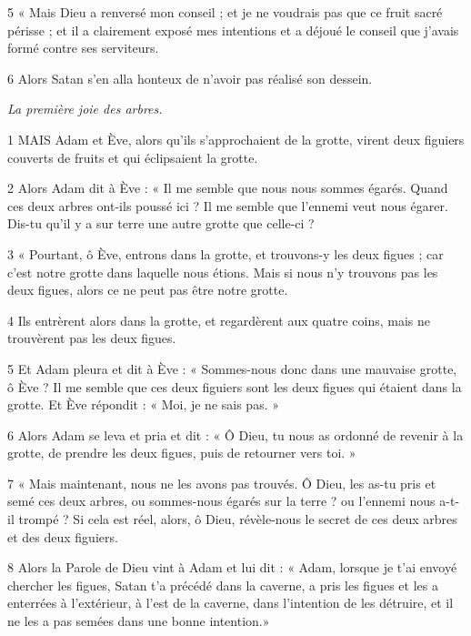 \par 5 « Mais Dieu a renversé mon conseil ; et je ne voudrais pas que ce fruit sacré périsse ; et il a clairement exposé mes intentions et a déjoué le conseil que j'avais formé contre ses serviteurs.

\par 6 Alors Satan s'en alla honteux de n'avoir pas réalisé son dessein.


\par \textit{La première joie des arbres.}

\par 1 MAIS Adam et Ève, alors qu'ils s'approchaient de la grotte, virent deux figuiers couverts de fruits et qui éclipsaient la grotte.

\par 2 Alors Adam dit à Ève : « Il me semble que nous nous sommes égarés. Quand ces deux arbres ont-ils poussé ici ? Il me semble que l’ennemi veut nous égarer. Dis-tu qu’il y a sur terre une autre grotte que celle-ci ?

\par 3 « Pourtant, ô Ève, entrons dans la grotte, et trouvons-y les deux figues ; car c'est notre grotte dans laquelle nous étions. Mais si nous n’y trouvons pas les deux figues, alors ce ne peut pas être notre grotte.

\par 4 Ils entrèrent alors dans la grotte, et regardèrent aux quatre coins, mais ne trouvèrent pas les deux figues.

\par 5 Et Adam pleura et dit à Ève : « Sommes-nous donc dans une mauvaise grotte, ô Ève ? Il me semble que ces deux figuiers sont les deux figues qui étaient dans la grotte. Et Ève répondit : « Moi, je ne sais pas. »

\par 6 Alors Adam se leva et pria et dit : « Ô Dieu, tu nous as ordonné de revenir à la grotte, de prendre les deux figues, puis de retourner vers toi. »

\par 7 « Mais maintenant, nous ne les avons pas trouvés. Ô Dieu, les as-tu pris et semé ces deux arbres, ou sommes-nous égarés sur la terre ? ou l'ennemi nous a-t-il trompé ? Si cela est réel, alors, ô Dieu, révèle-nous le secret de ces deux arbres et des deux figuiers.

\par 8 Alors la Parole de Dieu vint à Adam et lui dit : « Adam, lorsque je t'ai envoyé chercher les figues, Satan t'a précédé dans la caverne, a pris les figues et les a enterrées à l'extérieur, à l'est de la caverne, dans l'intention de les détruire, et il ne les a pas semées dans une bonne intention.»

